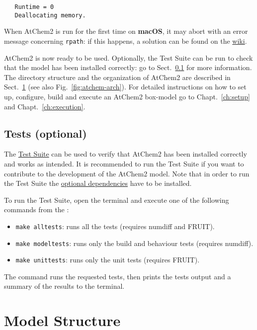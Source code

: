 \begin{enumerate}
\begin{verbatim}
   Runtime = 0
   Deallocating memory.
  \end{verbatim}
\end{enumerate}

When AtChem2 is run for the first time on \textbf{macOS}, it may abort
with an error message concerning \texttt{rpath}: if this happens,
a solution can be found on the
\href{https://github.com/AtChem/AtChem2/wiki/Known-Issues}{wiki}.

AtChem2 is now ready to be used. Optionally, the Test Suite can be run
to check that the model has been installed correctly: go to
Sect.~\ref{subsec:tests-optional} for more information. The directory
structure and the organization of AtChem2 are described in
Sect.~\ref{sec:model-structure} (see also Fig.~\ref{fig:atchem-arch}).
For detailed instructions on how to set up, configure, build and
execute an AtChem2 box-model go to Chapt.~\ref{ch:setup} and
Chapt.~\ref{ch:execution}.

\subsection{Tests (optional)} \label{subsec:tests-optional}

The \hyperref[sec:test-suite]{Test Suite} can be used to verify that
AtChem2 has been installed correctly and works as intended. It is
recommended to run the Test Suite if you want to contribute to the
development of the AtChem2 model. Note that in order to run the Test
Suite the \hyperref[subsec:optional-dependencies]{optional dependencies}
have to be installed.

To run the Test Suite, open the terminal and execute one of the
following commands from the \maindir:

\begin{itemize}
\item \verb|make alltests|: runs all the tests (requires numdiff and
  FRUIT).
\item \verb|make modeltests|: runs only the build and behaviour tests
  (requires numdiff).
\item \verb|make unittests|: runs only the unit tests (requires
  FRUIT).
\end{itemize}

The command runs the requested tests, then prints the tests output and
a summary of the results to the terminal.

\section{Model Structure} \label{sec:model-structure}

